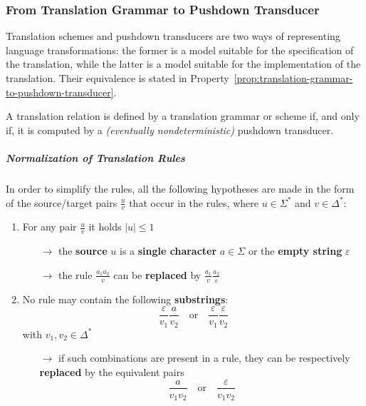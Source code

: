 \documentclass[english]{article}
\begin{document}
\subsubsection{From Translation Grammar to Pushdown Transducer}

Translation schemes and pushdown transducers are two ways of representing language transformations:
the former is a model suitable for the specification of the translation, while the latter is a model suitable for the implementation of the translation.
Their equivalence is stated in Property~\ref{prop:translation-grammar-to-pushdown-transducer}.

\begin{property}
  \label{prop:translation-grammar-to-pushdown-transducer}
  A translation relation is defined by a translation grammar or scheme if, and only if, it is computed by a \textit{(eventually nondeterministic)} pushdown transducer.
\end{property}

\subparagraph*{Normalization of Translation Rules}

In order to simplify the rules, all the following hypotheses are made in the form of the source/target pairs \(\frac{u}{v}\) that occur in the rules, where \(u \in \Sigma^\ast\) and \(v \in \Delta^\ast\):

\begin{enumerate}
  \item For any pair \(\frac{u}{v}\) it holds \(|u| \leq 1\)
        \begin{itemize}
          \item[\(\rightarrow\)] the \textbf{source} \(u\) is a \textbf{single character} \(a \in \Sigma\) or the \textbf{empty string} \(\varepsilon\)
          \item[\(\rightarrow\)] the rule \(\frac{a_1 a_2}{v}\) can be \textbf{replaced} by \(\frac{a_1}{v}\frac{a_2}{\varepsilon}\)
        \end{itemize}
  \item No rule may contain the following \textbf{substrings}:
        \[ \dfrac{\varepsilon}{v_1} \dfrac{a}{v_2} \quad \text{or} \quad \dfrac{\varepsilon}{v_1} \dfrac{\varepsilon}{v_2} \]
        with \(v_1, v_2 \in \Delta^\ast\)
        \begin{itemize}
          \item[\(\rightarrow\)] if such combinations are present in a rule, they can be respectively \textbf{replaced} by the equivalent pairs
            \[ \dfrac{a}{v_1 v_2} \quad \text{or} \quad \dfrac{\varepsilon}{v_1 v_2} \]
        \end{itemize}
\end{enumerate}
\end{document}
